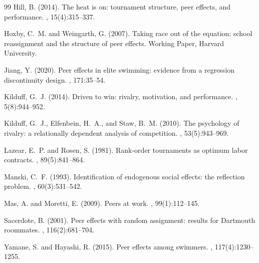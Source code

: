 \documentclass[12pt]{article}
\theoremstyle{definition}
\theoremstyle{remark}
\begin{document}
\begin{thebibliography}{99}
Hill, B. (2014).
\newblock The heat is on: tournament structure, peer effects, and performance.
, 15(4):315--337.

Hoxby, C.~M. and Weingarth, G. (2007).
\newblock Taking race out of the equation: school reassignment and the structure of peer effects.
\newblock Working Paper, Harvard University.

Jiang, Y. (2020).
\newblock Peer effects in elite swimming: evidence from a regression discontinuity design.
, 171:35--54.

Kilduff, G.~J. (2014).
\newblock Driven to win: rivalry, motivation, and performance.
, 5(8):944--952.

Kilduff, G.~J., Elfenbein, H.~A., and Staw, B.~M. (2010).
\newblock The psychology of rivalry: a relationally dependent analysis of competition.
, 53(5):943--969.

Lazear, E.~P. and Rosen, S. (1981).
\newblock Rank-order tournaments as optimum labor contracts.
, 89(5):841--864.

Manski, C.~F. (1993).
\newblock Identification of endogenous social effects: the reflection problem.
, 60(3):531--542.

Mas, A. and Moretti, E. (2009).
\newblock Peers at work.
, 99(1):112--145.

Sacerdote, B. (2001).
\newblock Peer effects with random assignment: results for Dartmouth roommates.
, 116(2):681--704.

Yamane, S. and Hayashi, R. (2015).
\newblock Peer effects among swimmers.
, 117(4):1230--1255.

\end{thebibliography}
\end{document}
